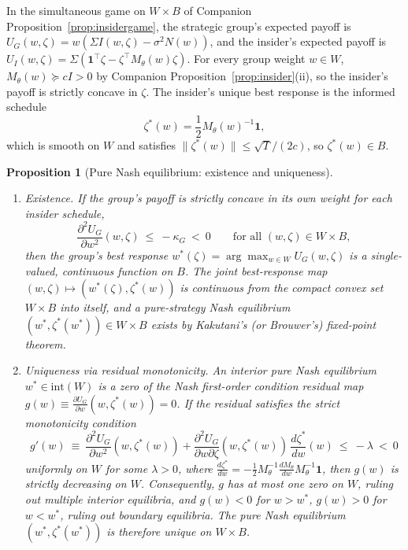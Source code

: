 \documentclass[12pt]{article}
\newtheorem{proposition}[theorem]{Proposition}
\theoremstyle{definition}
\theoremstyle{remark}
\begin{document}
In the simultaneous game on $W\times B$ of Companion Proposition~\ref{prop:insidergame}, the strategic group's expected payoff is $U_G(w,\zeta)=w(\Sigma I(w,\zeta)-\sigma^2 N(w))$, and the insider's expected payoff is $U_I(w,\zeta)=\Sigma(\mathbf 1^\top\zeta-\zeta^\top M_\theta(w)\zeta)$. For every group weight $w\in W$, $M_\theta(w)\succeq c I>0$ by Companion Proposition~\ref{prop:insider}(ii), so the insider's payoff is strictly concave in $\zeta$. The insider's unique best response is the informed schedule
\[
\zeta^*(w) = \frac12 M_\theta(w)^{-1}\mathbf 1,
\]
which is smooth on $W$ and satisfies $\|\zeta^*(w)\|\le\sqrt T/(2c)$, so $\zeta^*(w)\in B$.

\begin{proposition}[Pure Nash equilibrium: existence and uniqueness]\label{prop:nashqc}
\begin{enumerate}[label=(\roman*),itemsep=1pt]
\item \emph{Existence.} If the group's payoff is strictly concave in its own weight for each insider schedule,
\[
\frac{\partial^2 U_G}{\partial w^2}(w,\zeta)\ \le\ -\kappa_G\ <\ 0\qquad\text{for all }(w,\zeta)\in W\times B,
\]
then the group's best response $w^*(\zeta)=\arg\max_{w\in W}U_G(w,\zeta)$ is a single-valued, continuous function on $B$. The joint best-response map $(w,\zeta)\mapsto(w^*(\zeta),\zeta^*(w))$ is continuous from the compact convex set $W\times B$ into itself, and a pure-strategy Nash equilibrium $(w^*,\zeta^*(w^*))\in W\times B$ exists by Kakutani's (or Brouwer's) fixed-point theorem.
\item \emph{Uniqueness via residual monotonicity.} An interior pure Nash equilibrium $w^*\in\mathrm{int}(W)$ is a zero of the Nash first-order condition residual map $g(w)\equiv\frac{\partial U_G}{\partial w}(w,\zeta^*(w))=0$. If the residual satisfies the strict monotonicity condition
\[
g'(w)\ \equiv\ \frac{\partial^2 U_G}{\partial w^2}(w,\zeta^*(w)) + \frac{\partial^2 U_G}{\partial w\partial\zeta}(w,\zeta^*(w))\,\frac{d\zeta^*}{dw}(w)\ \le\ -\lambda\ <\ 0
\]
uniformly on $W$ for some $\lambda>0$, where $\frac{d\zeta^*}{dw}=-\frac12 M_\theta^{-1}\frac{dM_\theta}{dw}M_\theta^{-1}\mathbf 1$, then $g(w)$ is strictly decreasing on $W$. Consequently, $g$ has at most one zero on $W$, ruling out multiple interior equilibria, and $g(w)<0$ for $w>w^*$, $g(w)>0$ for $w<w^*$, ruling out boundary equilibria. The pure Nash equilibrium $(w^*,\zeta^*(w^*))$ is therefore unique on $W\times B$.
\end{enumerate}
\end{proposition}
\end{document}
